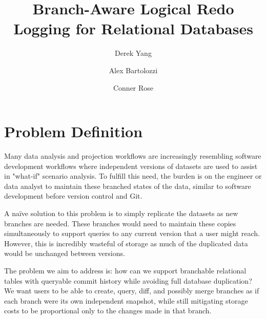 \documentclass[sigplan, nonacm]{acmart}
\begin{document}
\renewcommand\footnotetextcopyrightpermission[1]{}

\title{Branch-Aware Logical Redo Logging for Relational Databases}

\author{Derek Yang}

\author{Alex Bartolozzi}

\author{Conner Rose}

\maketitle

\section{Problem Definition}
Many data analysis and projection workflows are increasingly resembling software development workflows where independent versions of datasets are used to assist in "what-if" scenario analysis. To fulfill this need, the burden is on the engineer or data analyst to maintain these branched states of the data, similar to software development before version control and Git.

A naïve solution to this problem is to simply replicate the datasets as new branches are needed. These branches would need to maintain these copies simultaneously to support queries to any current version that a user might reach. However, this is incredibly wasteful of storage as much of the duplicated data would be unchanged between versions.

The problem we aim to address is: how can we support branchable relational tables with queryable commit history while avoiding full database duplication? We want users to be able to create, query, diff, and possibly merge branches as if each branch were its own independent snapshot, while still mitigating storage costs to be proportional only to the changes made in that branch.
\end{document}
